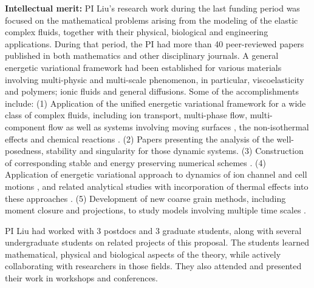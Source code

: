 \documentclass[11pt]{NSFamsart}
\begin{document}
\noindent\textbf{Intellectual merit:}  
PI Liu's research work during the last funding period was focused on the mathematical problems
arising from the modeling of the elastic complex fluids, together
with their physical, biological and engineering applications.
During that period, the PI had more than 40 peer-reviewed papers published in both mathematics and  other disciplinary journals. A general energetic variational framework had been established for various materials
involving multi-physic and multi-scale phenomenon,  in particular, viscoelasticity and polymers;  ionic fluids and general diffusions.
Some of the accomplishments include: (1) Application of the unified energetic variational framework for a wide class of complex fluids, including ion transport, multi-phase flow,
multi-component flow as well as systems involving moving  surfaces \cite{HuLiLi18,
yang_thermodynamically_2018,benesova_existence_2018, deng_largest_2017,xu_strong_2017,benesova_existence_2018,liu_energetic_2019, Kirshtein2020}, the non-isothermal effects \cite{de2019non,liu2018non, hsieh2020global, Jan-Eric}
and chemical reactions \cite{terebus2018discrete, wang2020field}. 
(2) Papers \cite{liu_energetic_2019, epshteyn2019large, Jan-Eric, hsieh2020global} presenting the analysis of the well-posedness, stability and singularity
for those dynamic systems. (3) Construction of corresponding stable and energy preserving numerical schemes \cite{duan_numerical_2019,xu_numerical_2019,duan_numerical_2019-2, wu2019energetic, liu2020lagrangian, liu2020variational, liu2020structure,duan2020structure}.
 (4)  Application of energetic variational approach to dynamics of ion channel and cell motions \cite{horng_continuum_2019,gavish_bistable_2018, liu_generalized_2017},
and related analytical studies \cite{WaLiTa17, hsieh2020global} with incorporation of thermal effects into these approaches \cite{liu2018non, wu2019energetic, hsieh2020global}.  (5) Development of new coarse grain  methods, including moment closure and projections, to study models involving multiple time scales
\cite{ma_fluctuation-dissipation_2017,ma_coarse-graining_2019}.


  PI Liu had worked with
3 postdocs and 3 graduate students, along with several undergraduate students 
on related projects of this proposal. 
The students learned mathematical, physical and biological
aspects of the theory, while actively collaborating  with researchers in those fields.
They also attended and presented their work in workshops and conferences.
\end{document}
